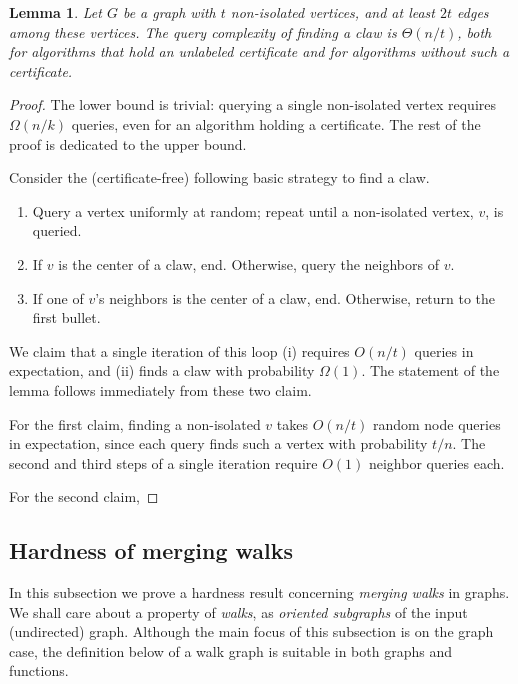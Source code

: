 \documentclass[11pt]{article}
\numberwithin{equation}{section}
\newtheorem{lemma}[lemma]{Lemma}
\newcommand{\1}{\mathbf{1}}
\begin{document}
\begin{lemma}
Let $G$ be a graph with $t$ non-isolated vertices, and at least $2t$ edges among these vertices. The query complexity of finding a claw is $\Theta(n/t)$, both for algorithms that hold an unlabeled certificate and for algorithms without such a certificate.
\end{lemma}
\begin{proof}
The lower bound is trivial: querying a single non-isolated vertex requires $\Omega(n/k)$ queries, even for an algorithm holding a certificate. The rest of the proof is dedicated to the upper bound. 

Consider the (certificate-free) following basic strategy to find a claw. 
\begin{enumerate}
\item Query a vertex uniformly at random; repeat until a non-isolated vertex, $v$, is queried.
\item If $v$ is the center of a claw, end. Otherwise, query the neighbors of $v$.
\item If one of $v$'s neighbors is the center of a claw, end. Otherwise, return to the first bullet.
\end{enumerate}
We claim that a single iteration of this loop (i) requires $O(n/t)$ queries in expectation, and (ii) finds a claw with probability $\Omega(1)$. The statement of the lemma follows immediately from these two claim.

For the first claim, finding a non-isolated $v$ takes $O(n/t)$ random node queries in expectation, since each query finds such a vertex with probability $t/n$. The second and third steps of a single iteration require $O(1)$ neighbor queries each.

For the second claim, 

\end{proof}
\fi

\subsection{Hardness of merging walks} \label{sec:nomerge}



In this subsection we prove a hardness result concerning \emph{merging walks} in graphs. We shall care about a property of \emph{walks}, as \emph{oriented subgraphs} of the input (undirected) graph. Although the main focus of this subsection is on the graph case, the definition below of a walk graph is suitable in both graphs and functions.
\end{document}
